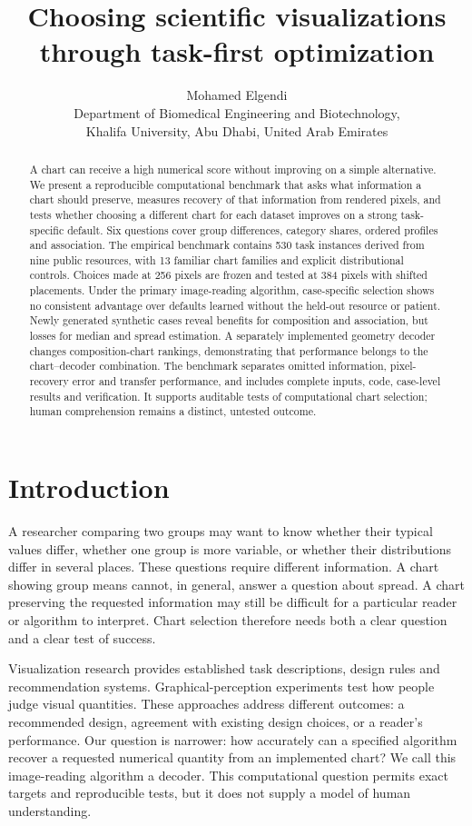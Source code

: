 \documentclass[11pt]{article}
\title{Choosing scientific visualizations through task-first optimization}
\author{Mohamed Elgendi\\\small Department of Biomedical Engineering and Biotechnology,\\\small Khalifa University, Abu Dhabi, United Arab Emirates}
\date{}
\begin{document}
\maketitle
\begin{abstract}
A chart can receive a high numerical score without improving on a simple alternative. We present a reproducible computational benchmark that asks what information a chart should preserve, measures recovery of that information from rendered pixels, and tests whether choosing a different chart for each dataset improves on a strong task-specific default. Six questions cover group differences, category shares, ordered profiles and association. The empirical benchmark contains 530 task instances derived from nine public resources, with 13 familiar chart families and explicit distributional controls. Choices made at 256 pixels are frozen and tested at 384 pixels with shifted placements. Under the primary image-reading algorithm, case-specific selection shows no consistent advantage over defaults learned without the held-out resource or patient. Newly generated synthetic cases reveal benefits for composition and association, but losses for median and spread estimation. A separately implemented geometry decoder changes composition-chart rankings, demonstrating that performance belongs to the chart--decoder combination. The benchmark separates omitted information, pixel-recovery error and transfer performance, and includes complete inputs, code, case-level results and verification. It supports auditable tests of computational chart selection; human comprehension remains a distinct, untested outcome.
\end{abstract}

\section*{Introduction}
A researcher comparing two groups may want to know whether their typical values differ, whether one group is more variable, or whether their distributions differ in several places. These questions require different information. A chart showing group means cannot, in general, answer a question about spread. A chart preserving the requested information may still be difficult for a particular reader or algorithm to interpret. Chart selection therefore needs both a clear question and a clear test of success.

Visualization research provides established task descriptions, design rules and recommendation systems.\cite{amar2005,brehmer2013,mackinlay1986,draco,vizml} Graphical-perception experiments test how people judge visual quantities.\cite{cleveland1984,heer2010} These approaches address different outcomes: a recommended design, agreement with existing design choices, or a reader's performance. Our question is narrower: how accurately can a specified algorithm recover a requested numerical quantity from an implemented chart? We call this image-reading algorithm a decoder. This computational question permits exact targets and reproducible tests, but it does not supply a model of human understanding.
\end{document}
